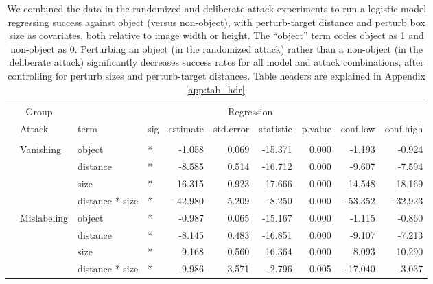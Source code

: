 \documentclass[
]{article}
\begin{document}
\begin{longtable}[t]{llllrrrrrr}
\caption{\label{tab:rand_arb_compare_table}We combined the data in the randomized and deliberate attack experiments to run a logistic model regressing success against object (versus non-object), with perturb-target distance and perturb box size as covariates, both relative to image width or height. The ``object'' term codes object as 1 and non-object as 0. Perturbing an object (in the randomized attack) rather than a non-object (in the deliberate attack) significantly decreases success rates for all model and attack combinations, after controlling for perturb sizes and perturb-target distances. Table headers are explained in Appendix \ref{app:tab_hdr}.}\\
\toprule
\multicolumn{2}{c}{Group} & \multicolumn{8}{c}{Regression} \\
\cmidrule(l{3pt}r{3pt}){1-2} \cmidrule(l{3pt}r{3pt}){3-10}
 & Attack & term & sig & estimate & std.error & statistic & p.value & conf.low & conf.high\\
\midrule
\addlinespace[0.3em]
\multicolumn{10}{l}{\textbf{YOLOv3}}\\
\hspace{1em} & Vanishing & object & * & -1.058 & 0.069 & -15.371 & 0.000 & -1.193 & -0.924\\
\cmidrule{3-10}\nopagebreak
\hspace{1em} &  & distance & * & -8.585 & 0.514 & -16.712 & 0.000 & -9.607 & -7.594\\
\cmidrule{3-10}\nopagebreak
\hspace{1em} &  & size & * & 16.315 & 0.923 & 17.666 & 0.000 & 14.548 & 18.169\\
\cmidrule{3-10}\nopagebreak
\hspace{1em} &  & distance * size & * & -42.980 & 5.209 & -8.250 & 0.000 & -53.352 & -32.923\\
\cmidrule{2-10}\nopagebreak
\hspace{1em} & Mislabeling & object & * & -0.987 & 0.065 & -15.167 & 0.000 & -1.115 & -0.860\\
\cmidrule{3-10}\nopagebreak
\hspace{1em} &  & distance & * & -8.145 & 0.483 & -16.851 & 0.000 & -9.107 & -7.213\\
\cmidrule{3-10}\nopagebreak
\hspace{1em} &  & size & * & 9.168 & 0.560 & 16.364 & 0.000 & 8.093 & 10.290\\
\cmidrule{3-10}\nopagebreak
\hspace{1em} &  & distance * size & * & -9.986 & 3.571 & -2.796 & 0.005 & -17.040 & -3.037\\

\end{longtable}
\end{document}
